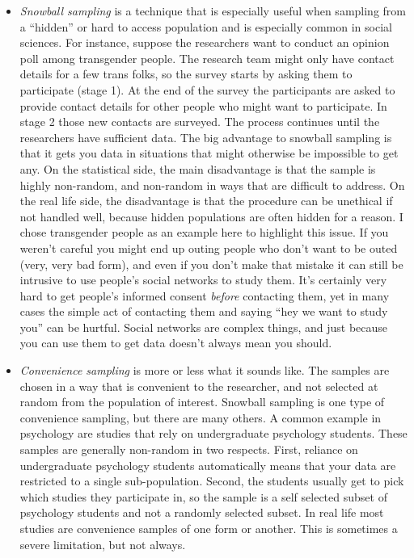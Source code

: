 \begin{itemize}
\item {\it Snowball sampling} is a technique that is especially useful when sampling from a ``hidden'' or hard to access population and is especially common in social sciences. For instance, suppose the researchers want to conduct an opinion poll among transgender people. The research team might only have contact details for a few trans folks, so the survey starts by asking them to participate (stage 1). At the end of the survey the participants are asked to provide contact details for other people who might want to participate. In stage 2 those new contacts are surveyed. The process continues until the researchers have sufficient data. The big advantage to snowball sampling is that it gets you data in situations that might otherwise be impossible to get any. On the statistical side, the main disadvantage is that the sample is highly non-random, and non-random in ways that are difficult to address. On the real life side, the disadvantage is that the procedure can be unethical if not handled well, because hidden populations are often hidden for a reason. I chose transgender people as an example here to highlight this issue. If you weren't careful you might end up outing people who don't want to be outed (very, very bad form), and even if you don't make that mistake it can still be intrusive to use people's social networks to study them. It's certainly very hard to get people's informed consent {\it before} contacting them, yet in many cases the simple act of contacting them and saying ``hey we want to study you'' can be hurtful. Social networks are complex things, and just because you can use them to get data doesn't always mean you should.
\item {\it Convenience sampling} is more or less what it sounds like. The samples are chosen in a way that is convenient to the researcher, and not selected at random from the population of interest. Snowball sampling is one type of convenience sampling, but there are many others. A common example in psychology are studies that rely on undergraduate psychology students. These samples are generally non-random in two respects. First, reliance on undergraduate psychology students automatically means that your data are restricted to a single sub-population. Second, the students usually get to pick which studies they participate in, so the sample is a self selected subset of psychology students and not a randomly selected subset. In real life most studies are convenience samples of one form or another. This is sometimes a severe limitation, but not always.
\end{itemize}

